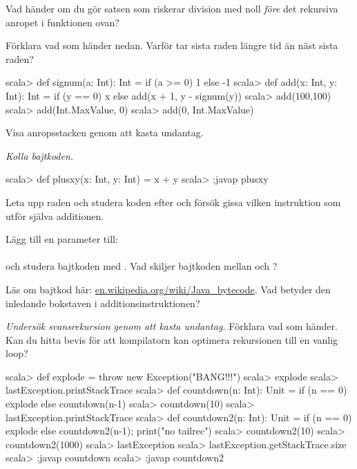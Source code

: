\Subtask Vad händer om du gör satsen som riskerar division med noll \emph{före} det rekursiva anropet i funktionen  ovan?

\Subtask Förklara vad som händer nedan. Varför tar sista raden längre tid än näst sista raden?
\begin{REPL}
scala> def signum(a: Int): Int = if (a >= 0) 1 else -1 
scala> def add(x: Int, y: Int): Int = 
         if (y == 0) x else add(x + 1, y - signum(y))
scala> add(100,100)
scala> add(Int.MaxValue, 0)
scala> add(0, Int.MaxValue)
\end{REPL}



\ExtraTasks %

\Task Visa anropsstacken genom att kasta undantag.

\AdvancedTasks %



\Task \emph{Kolla bajtkoden.}
\begin{REPL}
scala> def plusxy(x: Int, y: Int) = x + y
scala> :javap plusxy
\end{REPL}

\Subtask Leta upp raden  och studera koden efter  och försök gissa vilken instruktion som utför själva additionen.

\Subtask Lägg till en parameter till: \\ 
\\ och studera bajtkoden med . Vad skiljer bajtkoden mellan  och ?

\Subtask\Pen Läs om bajtkod här: \href{https://en.wikipedia.org/wiki/Java\_bytecode}{en.wikipedia.org/wiki/Java\_bytecode}. Vad betyder den inledande bokstaven i additionsinstruktionen?


\Task \emph{Undersök svansrekursion genom att kasta undantag.} Förklara vad som händer. Kan du hitta bevis för att kompilatorn kan optimera rekursionen till en vanlig loop?

\begin{REPL}
scala> def explode = throw new Exception("BANG!!!")
scala> explode
scala> lastException.printStackTrace
scala> def countdown(n: Int): Unit = 
         if (n == 0) explode else countdown(n-1)
scala> countdown(10)
scala> lastException.printStackTrace
scala> def countdown2(n: Int): Unit = 
         if (n == 0) explode else {countdown2(n-1); print("no tailrec")}
scala> countdown2(10)
scala> countdown2(1000)
scala> lastException
scala> lastException.getStackTrace.size
scala> :javap countdown
scala> :javap countdown2
\end{REPL}

